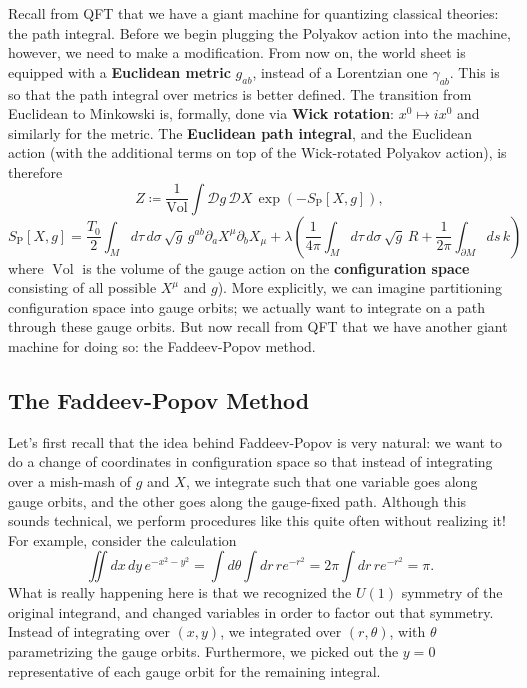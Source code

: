 \documentclass{report}
\theoremstyle{plain}
\theoremstyle{definition}
\theoremstyle{remark}
\newcommand{\di}{\partial}
\newcommand{\cD}{\mathcal{D}}
\DeclareMathOperator{\Vol}{Vol}
\begin{document}
Recall from QFT that we have a giant machine for quantizing classical
theories: the path integral. Before we begin plugging the Polyakov
action into the machine, however, we need to make a modification. From
now on, the world sheet is equipped with a {\bf Euclidean metric}
$g_{ab}$, instead of a Lorentzian one $\gamma_{ab}$. This is so that
the path integral over metrics is better defined. The transition from
Euclidean to Minkowski is, formally, done via {\bf Wick rotation}:
$x^0 \mapsto ix^0$ and similarly for the metric. The {\bf Euclidean
  path integral}, and the Euclidean action (with the additional terms
on top of the Wick-rotated Polyakov action), is therefore
\[ Z \coloneqq \frac{1}{\Vol} \int \cD g \, \cD X \, \exp(-S_{\text{P}}[X, g]), \]
\[ S_{\text{P}}[X, g] = \frac{T_0}{2} \int_M d\tau \, d\sigma \, \sqrt{g} \, g^{ab} \di_a X^\mu \di_b X_\mu + \lambda\left(\frac{1}{4\pi} \int_M d\tau \, d\sigma \, \sqrt{g} \, R + \frac{1}{2\pi}\int_{\di M} ds \, k\right) \]
where $\Vol$ is the volume of the gauge action on the {\bf
  configuration space} consisting of all possible $X^\mu$ and
$g$). More explicitly, we can imagine partitioning configuration
space into gauge orbits; we actually want to integrate on a path
through these gauge orbits. But now recall from QFT that we have
another giant machine for doing so: the Faddeev-Popov method.

\subsection{The Faddeev-Popov Method}

Let's first recall that the idea behind Faddeev-Popov is very natural:
we want to do a change of coordinates in configuration space so that
instead of integrating over a mish-mash of $g$ and $X$, we integrate
such that one variable goes along gauge orbits, and the other goes
along the gauge-fixed path. Although this sounds technical, we perform
procedures like this quite often without realizing it! For example,
consider the calculation
\[ \iint dx \, dy \, e^{-x^2 - y^2} = \int d\theta \int dr \, r e^{-r^2} = 2\pi \int dr \, r e^{-r^2} = \pi. \]
What is really happening here is that we recognized the $U(1)$
symmetry of the original integrand, and changed variables in order to
factor out that symmetry. Instead of integrating over $(x, y)$, we
integrated over $(r, \theta)$, with $\theta$ parametrizing the gauge
orbits. Furthermore, we picked out the $y = 0$ representative of
each gauge orbit for the remaining integral.
\end{document}
